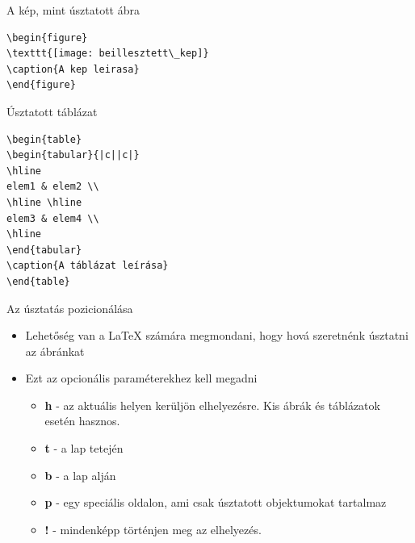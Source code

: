 \documentclass[11pt]{beamer}
\begin{document}
\begin{frame}[fragile]{A kép, mint úsztatott ábra}
\begin{verbatim}
\begin{figure}
\texttt{[image: beillesztett\_kep]}
\caption{A kep leirasa}
\end{figure}
\end{verbatim}
\end{frame}
 
\begin{frame}[fragile]{Úsztatott táblázat}
\begin{verbatim}
\begin{table}
\begin{tabular}{|c||c|}
\hline 
elem1 & elem2 \\ 
\hline \hline
elem3 & elem4 \\ 
\hline 
\end{tabular}
\caption{A táblázat leírása}
\end{table}
\end{verbatim}
\end{frame}

\begin{frame}{Az úsztatás pozicionálása}
\begin{itemize}
\item Lehetőség van a \LaTeX{} számára megmondani, hogy hová szeretnénk úsztatni az ábránkat
\item Ezt az opcionális paraméterekhez kell megadni
	\begin{itemize}
	\item \textbf{h} - az aktuális helyen kerüljön elhelyezésre. Kis ábrák és táblázatok esetén hasznos.
	\item \textbf{t} -  a lap tetején
	\item \textbf{b} - a lap alján
	\item \textbf{p} - egy speciális oldalon, ami csak úsztatott objektumokat tartalmaz
	\item \textbf{!} - mindenképp történjen meg az elhelyezés.
	\end{itemize}
\end{itemize}
\end{frame}
\end{document}
